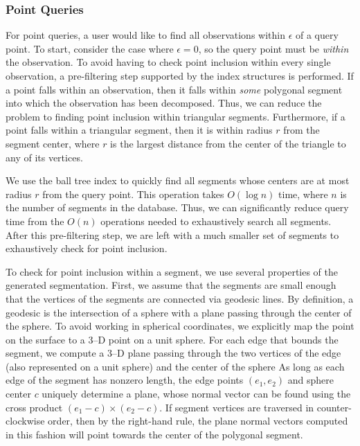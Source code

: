 \documentclass[twocolumn]{extarticle}
\begin{document}
\subsubsection*{Point Queries}

For point queries, a user would like to find all observations within $\epsilon$
of a query point.  To start, consider the case where $\epsilon = 0$, so the
query point must be \emph{within} the observation. To avoid having to check
point inclusion within every single observation, a pre-filtering step supported
by the index structures is performed. If a point falls within an observation,
then it falls within \emph{some} polygonal segment into which the observation
has been decomposed. Thus, we can reduce the problem to finding point inclusion
within triangular segments. Furthermore, if a point falls within a triangular
segment, then it is within radius $r$ from the segment center, where $r$ is the
largest distance from the center of the triangle to any of its vertices.

We use the ball tree index to quickly find all segments whose centers are at
most radius $r$ from the query point. This operation takes $O(\log n)$ time,
where $n$ is the number of segments in the database. Thus, we can significantly
reduce query time from the $O(n)$ operations needed to exhaustively search all
segments. After this pre-filtering step, we are left with a much smaller set of
segments to exhaustively check for point inclusion.

To check for point inclusion within a segment, we use several properties of the
generated segmentation. First, we assume that the segments are small enough that
the vertices of the segments are connected via geodesic lines. By definition, a
geodesic is the intersection of a sphere with a plane passing through the
center of the sphere. To avoid working in spherical coordinates, we explicitly
map the point on the surface to a 3--D point on a unit sphere. For each edge
that bounds the segment, we compute a 3--D plane passing through the two
vertices of the edge (also represented on a unit sphere) and the center of the
sphere As long as each edge of the segment has nonzero length,
the edge points $(e_1, e_2)$ and sphere center $c$ uniquely determine a plane,
whose normal vector can be found using the cross product $(e_1 - c)\times (e_2 -
c)$. If segment vertices are traversed in counter-clockwise order, then by the
right-hand rule, the plane normal vectors computed in this fashion will point
towards the center of the polygonal segment.
\end{document}
